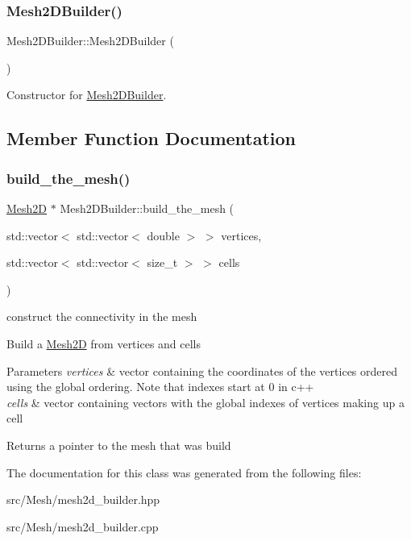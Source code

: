 \subsubsection{\texorpdfstring{Mesh2\+D\+Builder()}{Mesh2DBuilder()}}
{\footnotesize\ttfamily Mesh2\+D\+Builder\+::\+Mesh2\+D\+Builder (\begin{DoxyParamCaption}{ }\end{DoxyParamCaption})}

Constructor for \hyperlink{classHCore2D_1_1Mesh2DBuilder}{Mesh2\+D\+Builder}. 

\subsection{Member Function Documentation}
\mbox{\label{classHCore2D_1_1Mesh2DBuilder_a66379a977bf320cc456c4693b78707c8}} 
\subsubsection{\texorpdfstring{build\+\_\+the\+\_\+mesh()}{build\_the\_mesh()}}
{\footnotesize\ttfamily \hyperlink{classHCore2D_1_1Mesh2D}{Mesh2D} $\ast$ Mesh2\+D\+Builder\+::build\+\_\+the\+\_\+mesh (\begin{DoxyParamCaption}\item[{std\+::vector$<$ std\+::vector$<$ double $>$ $>$}]{vertices,  }\item[{std\+::vector$<$ std\+::vector$<$ size\+\_\+t $>$ $>$}]{cells }\end{DoxyParamCaption})}



construct the connectivity in the mesh 

Build a \hyperlink{classHCore2D_1_1Mesh2D}{Mesh2D} from vertices and cells


\begin{DoxyParams}{Parameters}
{\em vertices} & vector containing the coordinates of the vertices ordered using the global ordering. Note that indexes start at 0 in c++ \\
\hline
{\em cells} & vector containing vectors with the global indexes of vertices making up a cell\\
\hline
\end{DoxyParams}
\begin{DoxyReturn}{Returns}
a pointer to the mesh that was build 
\end{DoxyReturn}


The documentation for this class was generated from the following files\+:\begin{DoxyCompactItemize}
\item 
src/\+Mesh/mesh2d\+\_\+builder.\+hpp\item 
src/\+Mesh/mesh2d\+\_\+builder.\+cpp\end{DoxyCompactItemize}
